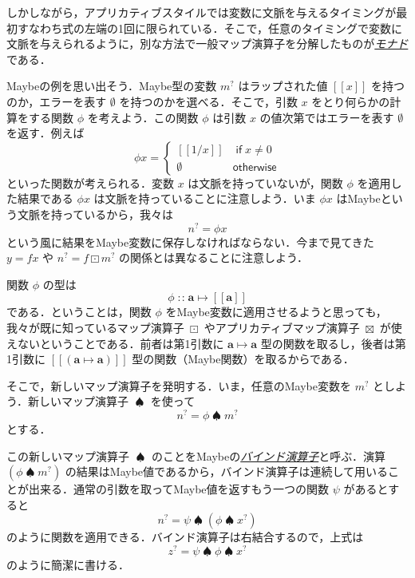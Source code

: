 \documentclass[a4paper]{jsbook}
\def\[{\left[\!\left[}
\def\]{\right]\!\right]}
\newcommand{\keyword}[1]{{\underline{\emph{#1}}}}
\newcommand{\mType}[1]{\mathbf{#1}}
\newcommand{\mMaybeType}[1]{\[\mType{#1}\]}
\newcommand{\mNothing}{\emptyset}
\newcommand{\mKeyword}[1]{\mathsf{#1}}
\newcommand{\mOtherwiseKeyword}{\mKeyword{otherwise}}
\newcommand{\mMaybeWith}[1]{\[#1\]}
\newcommand{\mMaybe}[1]{{#1}^\text{?}}
\DeclareMathOperator{\mIn}{{:\!:}}
\DeclareMathOperator{\mMapsTo}{\mapsto}
\DeclareMathOperator{\mMapMaybe}{\boxdot}
\DeclareMathOperator{\mApplicativeMapMaybe}{\boxtimes}
\DeclareMathOperator{\mBindMaybe}{\spadesuit}%
\DeclareMathOperator{\mOtherwise}{\mOtherwiseKeyword}
\newcommand{\mProjection}[2]{#1\mMapsTo#2}
\newcommand{\mathKeyword}[1]{\operatorname{\textsf{#1}}}
\newcommand{\mathIf}{\mathKeyword{if}}
\begin{document}
しかしながら，アプリカティブスタイルでは変数に文脈を与えるタイミングが最初すなわち式の左端の1回に限られている．そこで，任意のタイミングで変数に文脈を与えられるように，別な方法で一般マップ演算子を分解したものが\keyword{モナド}である．

Maybeの例を思い出そう．Maybe型の変数 $\mMaybe{m}$ はラップされた値 $\mMaybeWith{x}$ を持つのか，エラーを表す $\mNothing$ を持つのかを選べる．そこで，引数 $x$ をとり何らかの計算をする関数 $\phi$ を考えよう．この関数 $\phi$ は引数 $x$ の値次第ではエラーを表す $\mNothing$ を返す．例えば
\begin{equation}
\phi x=\begin{cases}
\mMaybeWith{1/x}&\mathIf x\neq0\\
\mNothing&\mOtherwise
\end{cases}
\end{equation}
といった関数が考えられる．変数 $x$ は文脈を持っていないが，関数 $\phi$ を適用した結果である $\phi x$ は文脈を持っていることに注意しよう．いま $\phi x$ はMaybeという文脈を持っているから，我々は
\begin{equation}
\mMaybe{n}=\phi x
\end{equation}
という風に結果をMaybe変数に保存しなければならない．今まで見てきた $y=fx$ や $\mMaybe{n}=f\mMapMaybe\mMaybe{m}$ の関係とは異なることに注意しよう．

関数 $\phi$ の型は
\begin{equation}
\phi\mIn\mProjection{\mType{a}}{\mMaybeType{a}}
\end{equation}
である．ということは，関数 $\phi$ をMaybe変数に適用させるようと思っても，我々が既に知っているマップ演算子 $\mMapMaybe$ やアプリカティブマップ演算子 $\mApplicativeMapMaybe$ が使えないということである．前者は第1引数に $\mProjection{\mType{a}}{\mType{a}}$ 型の関数を取るし，後者は第1引数に $\mMaybeWith{(\mProjection{\mType{a}}{\mType{a}})}$ 型の関数（Maybe関数）を取るからである． %

そこで，新しいマップ演算子を発明する．いま，任意のMaybe変数を $\mMaybe{m}$ としよう．新しいマップ演算子 $\mBindMaybe$ を使って
\begin{equation}
\mMaybe{n}=\phi\mBindMaybe\mMaybe{m}
\end{equation}
とする．

この新しいマップ演算子 $\mBindMaybe$ のことをMaybeの\keyword{バインド演算子}と呼ぶ．演算 $(\phi\mBindMaybe\mMaybe{m})$ の結果はMaybe値であるから，バインド演算子は連続して用いることが出来る．通常の引数を取ってMaybe値を返すもう一つの関数 $\psi$ があるとすると
\begin{equation}
\mMaybe{n}=\psi\mBindMaybe{}(\phi\mBindMaybe\mMaybe{x})
\end{equation}
のように関数を適用できる．バインド演算子は右結合するので，上式は
\begin{equation}
\label{eq:maybe-z-bind-style}
\mMaybe{z}=\psi\mBindMaybe\phi\mBindMaybe\mMaybe{x}
\end{equation}
のように簡潔に書ける．
\end{document}
